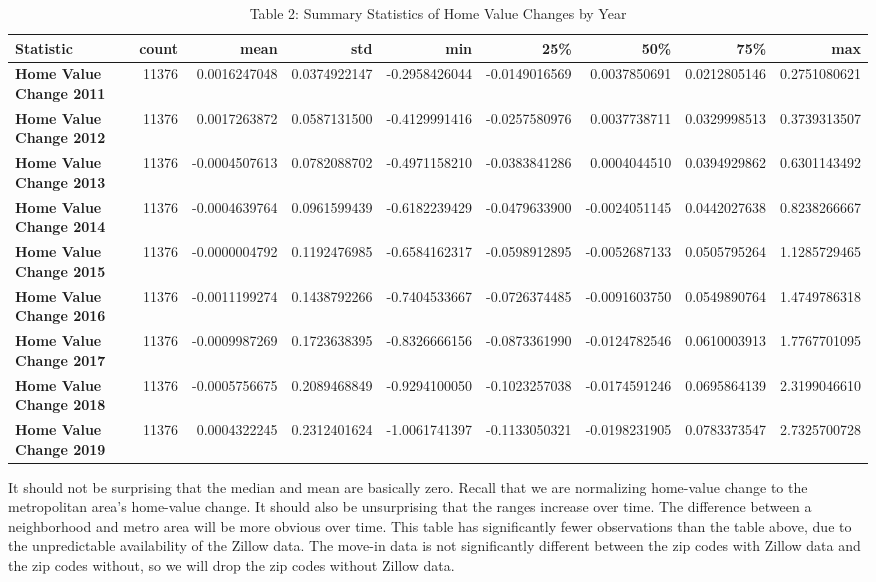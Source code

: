 \documentclass[11pt]{article}
\begin{document}
   
    \begin{table}[H]
        \caption{Table 2: Summary Statistics of Home Value Changes by Year}
        \label{tab:summary_stats}
        \begin{tabular}{lrrrrrrrr}
        \toprule
        Statistic & count & mean & std & min & 25\% & 50\% & 75\% & max \\
        \midrule
        \textbf{Home Value Change 2011} & 11376 & 0.0016247048 & 0.0374922147 & -0.2958426044 & -0.0149016569 & 0.0037850691 & 0.0212805146 & 0.2751080621 \\
        \textbf{Home Value Change 2012} & 11376 & 0.0017263872 & 0.0587131500 & -0.4129991416 & -0.0257580976 & 0.0037738711 & 0.0329998513 & 0.3739313507 \\
        \textbf{Home Value Change 2013} & 11376 & -0.0004507613 & 0.0782088702 & -0.4971158210 & -0.0383841286 & 0.0004044510 & 0.0394929862 & 0.6301143492 \\
        \textbf{Home Value Change 2014} & 11376 & -0.0004639764 & 0.0961599439 & -0.6182239429 & -0.0479633900 & -0.0024051145 & 0.0442027638 & 0.8238266667 \\
        \textbf{Home Value Change 2015} & 11376 & -0.0000004792 & 0.1192476985 & -0.6584162317 & -0.0598912895 & -0.0052687133 & 0.0505795264 & 1.1285729465 \\
        \textbf{Home Value Change 2016} & 11376 & -0.0011199274 & 0.1438792266 & -0.7404533667 & -0.0726374485 & -0.0091603750 & 0.0549890764 & 1.4749786318 \\
        \textbf{Home Value Change 2017} & 11376 & -0.0009987269 & 0.1723638395 & -0.8326666156 & -0.0873361990 & -0.0124782546 & 0.0610003913 & 1.7767701095 \\
        \textbf{Home Value Change 2018} & 11376 & -0.0005756675 & 0.2089468849 & -0.9294100050 & -0.1023257038 & -0.0174591246 & 0.0695864139 & 2.3199046610 \\
        \textbf{Home Value Change 2019} & 11376 & 0.0004322245 & 0.2312401624 & -1.0061741397 & -0.1133050321 & -0.0198231905 & 0.0783373547 & 2.7325700728 \\
        \bottomrule
        \end{tabular}
        \end{table}
             
    It should not be surprising that the median and mean are basically zero.
Recall that we are normalizing home-value change to the metropolitan
area's home-value change. It should also be unsurprising that the ranges
increase over time. The difference between a neighborhood and metro area
will be more obvious over time. This table has significantly fewer
observations than the table above, due to the unpredictable availability
of the Zillow data. The move-in data is not significantly different
between the zip codes with Zillow data and the zip codes without, so we
will drop the zip codes without Zillow data.
\end{document}
